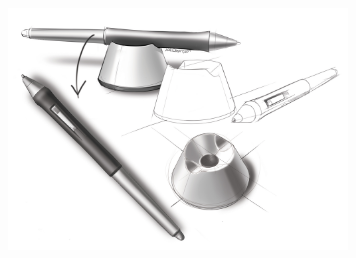 \begin{titlepage}
	\begin{addmargin}[-1cm]{-3cm}
    \begin{center}
        \large  

        \hfill

        \vfill

        \begingroup
            \color{Maroon}\spacedallcaps{\myTitle} \\ \bigskip
        \endgroup

        \spacedlowsmallcaps{\myNameA \& \myNameB}

        \vfill

        \includegraphics[width=9cm]{gfx/title_picture1} \\ \medskip



        \myDegree \\ \medskip   

        \myTime

        \vfill                      

    \end{center}  
  \end{addmargin}       
\end{titlepage}   